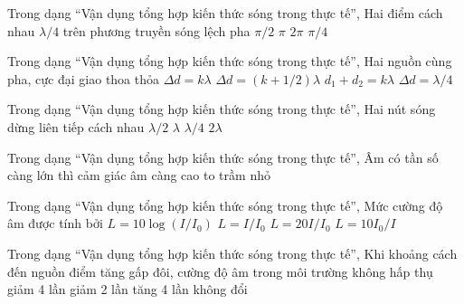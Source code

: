\begin{ex}
Trong dạng “Vận dụng tổng hợp kiến thức sóng trong thực tế”, Hai điểm cách nhau $\lambda/4$ trên phương truyền sóng lệch pha
\choice
{\True $\pi/2$}
{$\pi$}
{$2\pi$}
{$\pi/4$}
\end{ex}

\begin{ex}
Trong dạng “Vận dụng tổng hợp kiến thức sóng trong thực tế”, Hai nguồn cùng pha, cực đại giao thoa thỏa
\choice
{\True $\Delta d=k\lambda$}
{$\Delta d=(k+1/2)\lambda$}
{$d_1+d_2=k\lambda$}
{$\Delta d=\lambda/4$}
\end{ex}

\begin{ex}
Trong dạng “Vận dụng tổng hợp kiến thức sóng trong thực tế”, Hai nút sóng dừng liên tiếp cách nhau
\choice
{\True $\lambda/2$}
{$\lambda$}
{$\lambda/4$}
{$2\lambda$}
\end{ex}

\begin{ex}
Trong dạng “Vận dụng tổng hợp kiến thức sóng trong thực tế”, Âm có tần số càng lớn thì cảm giác âm càng
\choice
{\True cao}
{to}
{trầm}
{nhỏ}
\end{ex}

\begin{ex}
Trong dạng “Vận dụng tổng hợp kiến thức sóng trong thực tế”, Mức cường độ âm được tính bởi
\choice
{\True $L=10\log(I/I_0)$}
{$L=I/I_0$}
{$L=20I/I_0$}
{$L=10I_0/I$}
\end{ex}

\begin{ex}
Trong dạng “Vận dụng tổng hợp kiến thức sóng trong thực tế”, Khi khoảng cách đến nguồn điểm tăng gấp đôi, cường độ âm trong môi trường không hấp thụ
\choice
{\True giảm 4 lần}
{giảm 2 lần}
{tăng 4 lần}
{không đổi}
\end{ex}

